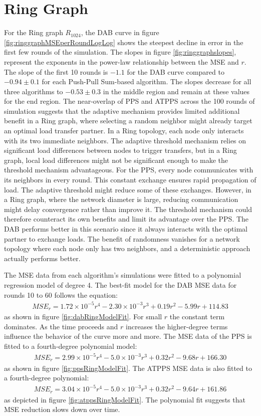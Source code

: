 \section{Ring Graph}\label{sec:ringgraph}
For the Ring graph $R_{1024}$, the DAB curve in figure \ref{fig:ringgraphMSEperRoundLogLog} shows the steepest decline in error in the first few rounds of the simulation. The slopes in figure \ref{fig:ringgraphslopes}, represent the exponents in the power-law relationship between the MSE and $r$. The slope of the first 10 rounds is $-1.1$ for the DAB curve compared to $-0.94 \pm 0.1$ for each Push-Pull Sum-based algorithm. The slopes decrease for all three algorithms to $-0.53 \pm 0.3$ in the middle region and remain at these values for the end region. The near-overlap of PPS and ATPPS across the 100 rounds of simulation suggests that the adaptive mechanism provides limited additional benefit in a Ring graph, where selecting a random neighbor might already target an optimal load transfer partner. In a Ring topology, each node only interacts with its two immediate neighbors. The adaptive threshold mechanism relies on significant load differences between nodes to trigger transfers, but in a Ring graph, local load differences might not be significant enough to make the threshold mechanism advantageous. For the PPS, every node communicates with its neighbors in every round. This constant exchange ensures rapid propagation of load. The adaptive threshold might reduce some of these exchanges. However, in a Ring graph, where the network diameter is large, reducing communication might delay convergence rather than improve it. The threshold mechanism could therefore counteract its own benefits and limit its advantage over the PPS. The DAB performs better in this scenario since it always interacts with the optimal partner to exchange loads. The benefit of randomness vanishes for a network topology where each node only has two neighbors, and a deterministic approach actually performs better.

The MSE data from each algorithm's simulations were fitted to a polynomial regression model of degree 4. The best-fit model for the DAB MSE data for rounds 10 to 60 follows the equation:
\begin{align}
    MSE_r=1.72\times 10^{-5}r^{4}-2.30\times 10^{-3}r^{3}+ 0.19r^{2}-5.99r+114.83    
\end{align}
as shown in figure \ref{fig:dabRingModelFit}. For small $r$ the constant term dominates. As the time proceeds and $r$ increases the higher-degree terms influence the behavior of the curve more and more. The MSE data of the PPS is fitted to a fourth-degree polynomial model:
\begin{align}
    MSE_r= 2.99\times 10^{-5}r^{4}-5.0\times 10^{-3}r^{3} + 0.32r^{2} -9.68r + 166.30    
\end{align}
as shown in figure \ref{fig:ppsRingModelFit}. The ATPPS MSE data is also fitted to a fourth-degree polynomial:
\begin{align}
    MSE_r=3.04\times 10^{-5}r^{4}-5.0\times 10^{-3}r^{3} + 0.32r^{2}-9.64r+161.86    
\end{align}
as depicted in figure \ref{fig:atppsRingModelFit}. The polynomial fit suggests that MSE reduction slows down over time.


